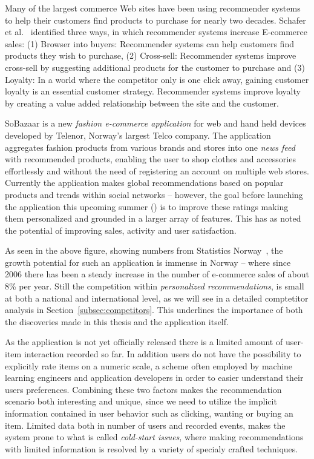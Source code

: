 Many of the largest commerce Web sites have been using recommender systems to
help their customers find products to purchase for nearly two decades.
Schafer et al.~\cite{Schafer1999} identified three ways, in which recommender
systems increase E-commerce sales: (1) Browser into buyers: Recommender systems
can help customers find products they wish to purchase, (2) Cross-sell:
Recommender systems improve cross-sell by suggesting additional products for
the customer to purchase and (3) Loyalty: In a world where the competitor only
is one click away, gaining customer loyalty is an essential customer strategy.
Recommender systems improve loyalty by creating a value added relationship
between the site and the customer.

SoBazaar is a new \textit{fashion e-commerce application} for web and hand held
devices developed by Telenor, Norway's largest Telco company. The application
aggregates fashion products from various brands and stores into one \emph{news
feed} with recommended products, enabling the user to shop clothes and
accessories effortlessly and without the need of registering an account on
multiple web stores. Currently the application makes global recommendations
based on popular products and trends within social networks -- however, the goal
before launching the application this upcoming summer (\the\year) is to improve
these ratings making them personalized and grounded in a larger array of
features. This has as noted the potential of improving sales, activity and user
satisfaction.

\ecommercenorway{}

As seen in the above figure, showing numbers from Statistics
Norway~\cite{statisticsNorway}, the growth potential for such an application is
immense in Norway -- where since 2006 there has been a steady increase in the
number of e-commerce sales of about 8\% per year. Still the competition within
\textit{personalized recommendations}, is small at both a national and
international level, as we will see in a detailed comptetitor analysis in
Section~\ref{subsec:competitors}. This underlines the importance of both the
discoveries made in this thesis and the application itself.

As the application is not yet officially released there is a limited amount of
user-item interaction recorded so far. In addition users do not have the
possibility to explicitly rate items on a numeric scale, a scheme often
employed by machine learning engineers and application developers in order to
easier understand their users preferences. Combining these two factors makes
the recommendation scenario both interesting and unique, since we need to
utilize the implicit information contained in user behavior such as clicking,
wanting or buying an item. Limited data both in number of users and recorded
events, makes the system prone to what is called \textit{cold-start issues},
where making recommendations with limited information is resolved by a variety
of specialy crafted techniques.

